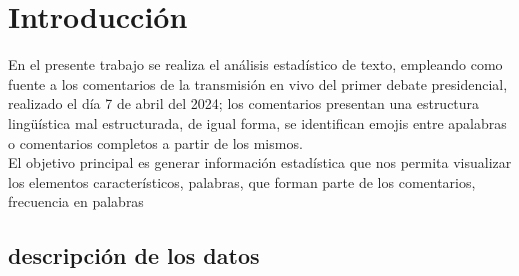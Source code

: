 \chapter{Introducción}

En el presente trabajo se realiza el análisis estadístico de texto, empleando como fuente a los comentarios de la transmisión en vivo del primer debate presidencial, realizado el día 7 de abril del 2024; los comentarios presentan una estructura lingüística mal estructurada, de igual forma, se identifican emojis entre apalabras o comentarios completos a partir de los mismos.\\


El objetivo principal es generar información estadística que nos permita visualizar los elementos característicos, palabras, que forman parte de los comentarios, frecuencia en palabras 



\section{descripción de los datos}



